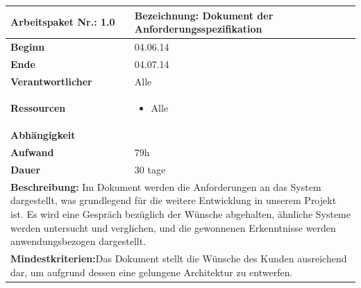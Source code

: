 \documentclass[fontsize=12pt,paper=a4,twoside]{scrartcl}
\begin{document}
\begin{verbatim} 
\end{verbatim}

\begin{tabular}{|p{5.3cm}|p{9.7cm}|}\hline
	\textbf{Arbeitspaket Nr.:} 1.0 & \textbf{Bezeichnung:} Dokument der Anforderungsspezifikation\\ \hline \hline
	\textbf{Beginn} & 04.06.14\\ \hline
	\textbf{Ende} & 04.07.14\\ \hline
	\textbf{Verantwortlicher} & Alle\\ \hline
		\textbf{Ressourcen} & \begin{itemize}
			\item Alle
		\end{itemize}    \\ \hline
		\textbf{Abhängigkeit} &\\ \hline
		\textbf{Aufwand} & 79h\\ \hline
		\textbf{Dauer} & 30 tage\\ \hline
		\multicolumn{2}{|p{15cm}|}{\textbf{Beschreibung:} Im Dokument werden die Anforderungen an das System dargestellt, was grundlegend für die weitere Entwicklung in unserem Projekt ist. Es wird eine Gespräch bezüglich der Wünsche abgehalten, ähnliche Systeme werden untersucht und verglichen, und die gewonnenen Erkenntnisse werden anwendungsbezogen dargestellt.\newline   }\\ \hline
		\multicolumn{2}{|p{15cm}|}{\textbf{Mindestkriterien:}\newline Das Dokument stellt die Wünsche des Kunden ausreichend dar, um aufgrund dessen eine gelungene Architektur zu entwerfen.}\\ \hline
	\end{tabular}
	
	\begin{verbatim} 
	\end{verbatim}
	
\end{document}

